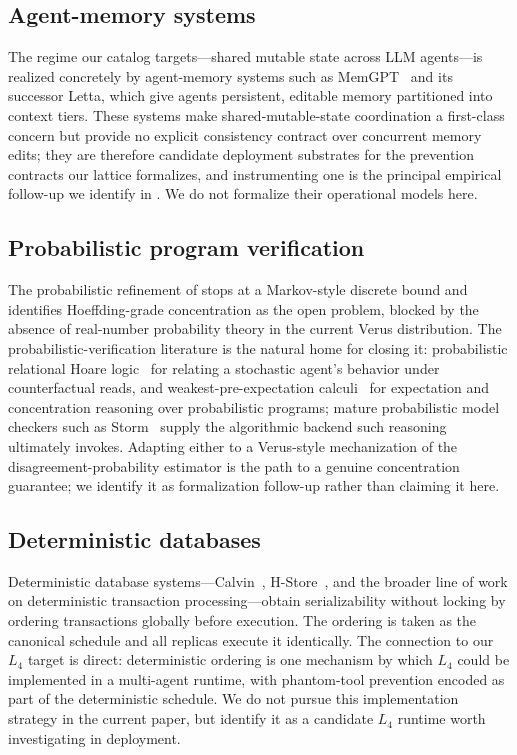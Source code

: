 \documentclass[journal,compsoc,10pt]{IEEEtran}
\providecommand{\citep}{\cite}
\theoremstyle{definition}
\theoremstyle{remark}
\begin{document}
\subsection{Agent-memory systems}
\label{sec:related-agent-memory}
The regime our catalog targets---shared mutable state across LLM
agents---is realized concretely by agent-memory systems such as
MemGPT~\citep{PackerEtAl2023MemGPT} and its successor Letta, which give
agents persistent, editable memory partitioned into context tiers. These
systems make shared-mutable-state coordination a first-class concern but
provide no explicit consistency contract over concurrent memory edits;
they are therefore candidate deployment substrates for the prevention
contracts our lattice formalizes, and instrumenting one is the principal
empirical follow-up we identify in . We do not
formalize their operational models here.

\subsection{Probabilistic program verification}
\label{sec:related-prob-verification}
The probabilistic refinement of  stops at a
Markov-style discrete bound and identifies Hoeffding-grade concentration
as the open problem, blocked by the absence of real-number probability
theory in the current Verus distribution. The probabilistic-verification
literature is the natural home for closing it: probabilistic relational
Hoare logic~\citep{BartheEtAl2012pRHL} for relating a stochastic agent's
behavior under counterfactual reads, and weakest-pre-expectation
calculi~\citep{KaminskiEtAl2016wp} for expectation and concentration
reasoning over probabilistic programs; mature probabilistic model checkers
such as Storm~\citep{DehnertEtAl2017Storm} supply the algorithmic backend
such reasoning ultimately invokes. Adapting either to a Verus-style
mechanization of the disagreement-probability estimator is the path to a
genuine concentration guarantee; we identify it as formalization
follow-up rather than claiming it here.

\subsection{Deterministic databases}
\label{sec:related-deterministic}
Deterministic database systems---Calvin~\citep{ThomsonEtAl2012Calvin},
H-Store~\citep{KallmanEtAl2008HStore}, and the broader line of work
on deterministic transaction processing---obtain serializability
without locking by ordering transactions globally before
execution. The ordering is taken as the canonical schedule and all
replicas execute it identically. The connection to our $L_4$
target is direct: deterministic ordering is one mechanism by which
$L_4$ could be implemented in a multi-agent runtime, with
phantom-tool prevention encoded as part of the deterministic
schedule. We do not pursue this implementation strategy in the
current paper, but identify it as a candidate $L_4$ runtime
worth investigating in deployment.
\end{document}
